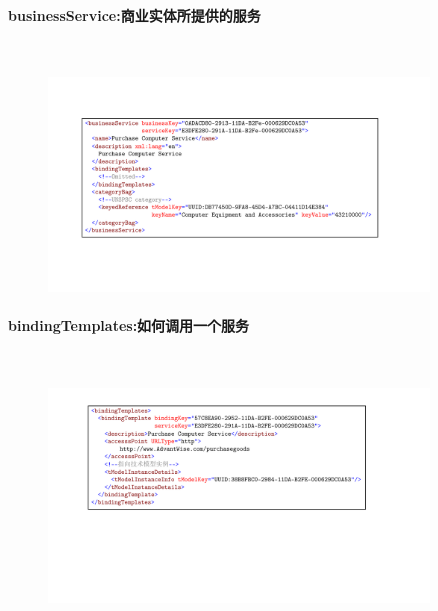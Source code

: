 \paragraph*{businessService:商业实体所提供的服务}~{} \par
\begin{figure}[H]
    \vspace{-0.5em}
	\centering
	\includegraphics[width=0.9\textwidth]{images/businessService.pdf}
    \vspace{-1em}
\end{figure}

\paragraph*{bindingTemplates:如何调用一个服务}~{} \par
\begin{figure}[H]
    \vspace{-0.5em}
	\centering
	\includegraphics[width=0.9\textwidth]{images/bindingTemplates.pdf}
    \vspace{-1em}
\end{figure}

